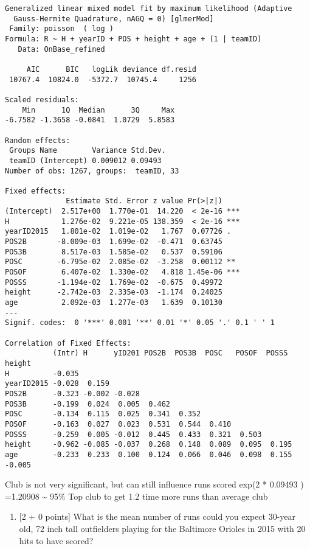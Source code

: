 \documentclass[
]{article}
\providecommand{\tightlist}{%
  \setlength{\itemsep}{0pt}\setlength{\parskip}{0pt}}
\begin{document}
\begin{verbatim}
Generalized linear mixed model fit by maximum likelihood (Adaptive
  Gauss-Hermite Quadrature, nAGQ = 0) [glmerMod]
 Family: poisson  ( log )
Formula: R ~ H + yearID + POS + height + age + (1 | teamID)
   Data: OnBase_refined

     AIC      BIC   logLik deviance df.resid 
 10767.4  10824.0  -5372.7  10745.4     1256 

Scaled residuals: 
    Min      1Q  Median      3Q     Max 
-6.7582 -1.3658 -0.0841  1.0729  5.8583 

Random effects:
 Groups Name        Variance Std.Dev.
 teamID (Intercept) 0.009012 0.09493 
Number of obs: 1267, groups:  teamID, 33

Fixed effects:
              Estimate Std. Error z value Pr(>|z|)    
(Intercept)  2.517e+00  1.770e-01  14.220  < 2e-16 ***
H            1.276e-02  9.221e-05 138.359  < 2e-16 ***
yearID2015   1.801e-02  1.019e-02   1.767  0.07726 .  
POS2B       -8.009e-03  1.699e-02  -0.471  0.63745    
POS3B        8.517e-03  1.585e-02   0.537  0.59106    
POSC        -6.795e-02  2.085e-02  -3.258  0.00112 ** 
POSOF        6.407e-02  1.330e-02   4.818 1.45e-06 ***
POSSS       -1.194e-02  1.769e-02  -0.675  0.49972    
height      -2.742e-03  2.335e-03  -1.174  0.24025    
age          2.092e-03  1.277e-03   1.639  0.10130    
---
Signif. codes:  0 '***' 0.001 '**' 0.01 '*' 0.05 '.' 0.1 ' ' 1

Correlation of Fixed Effects:
           (Intr) H      yID201 POS2B  POS3B  POSC   POSOF  POSSS  height
H          -0.035                                                        
yearID2015 -0.028  0.159                                                 
POS2B      -0.323 -0.002 -0.028                                          
POS3B      -0.199  0.024  0.005  0.462                                   
POSC       -0.134  0.115  0.025  0.341  0.352                            
POSOF      -0.163  0.027  0.023  0.531  0.544  0.410                     
POSSS      -0.259  0.005 -0.012  0.445  0.433  0.321  0.503              
height     -0.962 -0.085 -0.037  0.268  0.148  0.089  0.095  0.195       
age        -0.233  0.233  0.100  0.124  0.066  0.046  0.098  0.155 -0.005
\end{verbatim}

Club is not very significant, but can still influence runs scored exp(2
* 0.09493 ) =1.20908 \textasciitilde{} 95\% Top club to get 1.2 time
more runs than average club

\begin{enumerate}
\def\labelenumi{\alph{enumi}.}
\setcounter{enumi}{5}
\tightlist
\item
  {[}2 + 0 points{]} What is the mean number of runs could you expect
  30-year old, 72 inch tall outfielders playing for the Baltimore
  Orioles in 2015 with 20 hits to have scored?
\end{enumerate}
\end{document}
